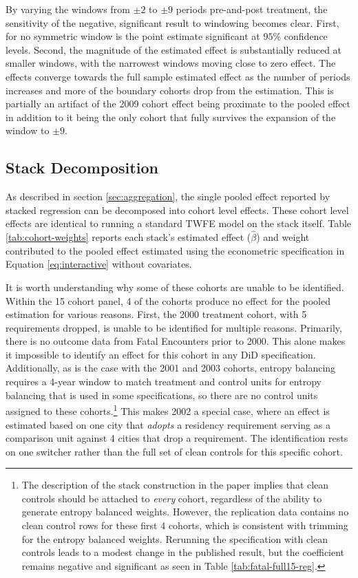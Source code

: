 \documentclass[12pt]{article}
\begin{document}
By varying the windows from $\pm 2$ to $\pm 9$ periods pre-and-post treatment, the sensitivity of the negative, significant result to windowing becomes clear. First, for no symmetric window is the point estimate significant at $95\%$ confidence levels. Second, the magnitude of the estimated effect is substantially reduced at smaller windows, with the narrowest windows moving close to zero effect. The effects converge towards the full sample estimated effect as the number of periods increases and more of the boundary cohorts drop from the estimation. This is partially an artifact of the 2009 cohort effect being proximate to the pooled effect in addition to it being the only cohort that fully survives the expansion of the window to $\pm 9$.

\subsection{Stack Decomposition}

As described in section \ref{sec:aggregation}, the single pooled effect reported by stacked regression can be decomposed into cohort level effects. These cohort level effects are identical to running a standard TWFE model on the stack itself. Table \ref{tab:cohort-weights} reports each stack's estimated effect ($\hat{\beta}$) and weight contributed to the pooled effect estimated using the econometric specification in Equation \ref{eq:interactive} without covariates.



It is worth understanding why some of these cohorts are unable to be identified. Within the 15 cohort panel, 4 of the cohorts produce no effect for the pooled estimation for various reasons. First, the 2000 treatment cohort, with 5 requirements dropped, is unable to be identified for multiple reasons. Primarily, there is no outcome data from Fatal Encounters prior to 2000. This alone makes it impossible to identify an effect for this cohort in any DiD specification. Additionally, as is the case with the 2001 and 2003 cohorts, entropy balancing requires a 4-year window to match treatment and control units for entropy balancing that is used in some specifications, so there are no control units assigned to these cohorts.\footnote{The description of the stack construction in the paper implies that clean controls should be attached to \textit{every} cohort, regardless of the ability to generate entropy balanced weights. However, the replication data contains no clean control rows for these first 4 cohorts, which is consistent with trimming for the entropy balanced weights. Rerunning the specification with clean controls leads to a modest change in the published result, but the coefficient remains negative and significant as seen in Table \ref{tab:fatal-full15-reg}.} This makes 2002 a special case, where an effect is estimated based on one city that \textit{adopts} a residency requirement serving as a comparison unit against 4 cities that drop a requirement. The identification rests on one switcher rather than the full set of clean controls for this specific cohort.
\end{document}
